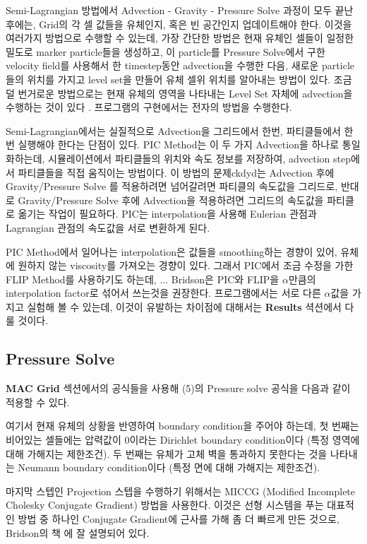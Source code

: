 \documentclass[10pt, A4]{article}
\begin{document}
Semi-Lagrangian 방법에서 Advection - Gravity - Pressure Solve 과정이 모두 끝난 후에는, Grid의 각 셀 값들을 유체인지, 혹은 빈 공간인지 업데이트해야 한다. 이것을 여러가지 방법으로 수행할 수 있는데, 가장 간단한 방법은 현재 유체인 셀들이 일정한 밀도로 marker particle들을 생성하고, 이 particle를 Pressure Solve에서 구한 velocity field를 사용해서 한 timestep동안 advection을 수행한 다음, 새로운 particle들의 위치를 가지고 level set을 만들어 유체 셀위 위치를 알아내는 방법이 있다. 조금 덜 번거로운 방법으로는 현재 유체의 영역을 나타내는 Level Set 자체에 advection을 수행하는 것이 있다 \cite[p.57]{fluid-sim-cg}. 프로그램의 구현에서는 전자의 방법을 수행한다.

Semi-Lagrangian에서는 실질적으로 Advection을 그리드에서 한번, 파티클들에서 한번 실행해야 한다는 단점이 있다. PIC Method는 이 두 가지 Advection을 하나로 통일화하는데, 시뮬레이션에서 파티클들의 위치와 속도 정보를 저장하여, advection step에서 파티클들을 직접 움직이는 방법이다. 이 방법의 문제ckdyd는 Advection 후에 Gravity/Pressure Solve 를 적용하려면 넘어갈려면 파티클의 속도값을 그리드로, 반대로 Gravity/Pressure Solve 후에 Advection을 적용하려면 그리드의 속도값을 파티클로 옮기는 작업이 필요하다. PIC는 interpolation을 사용해 Eulerian 관점과 Lagrangian 관점의 속도값을 서로 변환하게 된다. 

PIC Method에서 일어나는 interpolation은 값들을 smoothing하는 경향이 있어, 유체에 원하지 않는 viscosity를 가져오는 경향이 있다. 그래서 PIC에서 조금 수정을 가한 FLIP Method를 사용하기도 하는데, ... Bridson은 PIC와 FLIP을 $\alpha$만큼의 interpolation factor로 섞어서 쓰는것을 권장한다. 프로그램에서는 서로 다른 $\alpha$값을 가지고 실험해 볼 수 있는데, 이것이 유발하는 차이점에 대해서는 \textbf{Results} 셕션에서 다룰 것이다.

\subsection{Pressure Solve}

\textbf{MAC Grid} 섹션에서의 공식들을 사용해 (5)의 Pressure solve 공식을 다음과 같이 적용할 수 있다.

여기서 현재 유체의 상황을 반영하여 boundary condition을 주어야 하는데, 첫 번째는 비어있는 셀들에는 압력값이 0이라는 Dirichlet boundary condition이다 (특정 영역에 대해 가해지는 제한조건). 두 번째는 유체가 고체 벽을 통과하지 못한다는 것을 나타내는 Neumann boundary condition이다 (특정 면에 대해 가해지는 제한조건).

마지막 스텝인 Projection 스텝을 수행하기 위해서는 MICCG (Modified Incomplete Cholesky Conjugate Gradient) 방법을 사용한다. 이것은 선형 시스템을 푸는 대표적인 방법 중 하나인 Conjugate Gradient에 근사를 가해 좀 더 빠르게 만든 것으로, Bridson의 책 \cite[p.79]{fluid-sim-cg}에 잘 설명되어 있다.
\end{document}
